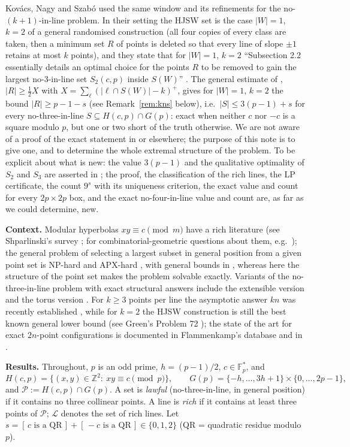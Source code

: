 \documentclass[11pt]{article}
\theoremstyle{remark}
\newcommand{\Fp}{\mathbb{F}_p}
\newcommand{\Z}{\mathbb{Z}}
\newcommand{\Hc}{H(c,p)}
\newcommand{\Gp}{G(p)}
\newcommand{\Lc}{\mathcal{L}}
\newcommand{\Pset}{\mathcal{P}}
\begin{document}
Kov\'acs, Nagy and Szab\'o \cite{KNS25} used the same window and its refinements for the no-$(k+1)$-in-line
problem.  In their setting the HJSW set is the case $|W|=1$, $k=2$ of a general randomised construction (all four
copies of every class are taken, then a minimum set $R$ of points is deleted so that every line of slope $\pm1$ retains
at most $k$ points), and they state that for $|W|=1$, $k=2$ ``Subsection 2.2 essentially details an optimal choice for the points $R$ to be
removed to gain the largest no-3-in-line set $S_2(c,p)$ inside $S(W)$'' \cite[App.~A]{KNS25}.
The general estimate of \cite[Rem.~3.4]{KNS25}, $|R|\ge\tfrac12 X$ with $X=\sum_\ell(|\ell\cap S(W)|-k)^+$, gives for
$|W|=1$, $k=2$ the bound $|R|\ge p-1-s$ (see Remark~\ref{rem:kns} below), i.e.\ $|S|\le3(p-1)+s$ for every no-three-in-line
$S\subseteq\Hc\cap\Gp$: exact when neither $c$ nor $-c$ is a square modulo $p$, but one or two short of the truth
otherwise.  We are not aware of a proof of the exact statement in \cite{KNS25} or elsewhere; the purpose of this note is
to give one, and to determine the whole extremal structure of the problem.  To be explicit about what is new: the value
$3(p-1)$ and the qualitative optimality of $S_2$ and $S_3$ are asserted in \cite{KNS25}; the proof, the classification of
the rich lines, the LP certificate, the count $9^s$ with its uniqueness criterion, the exact value and count for every
$2p\times2p$ box, and the exact no-four-in-line value and count are, as far as we could determine, new.

\medskip
\noindent\textbf{Context.}  Modular hyperbolas $xy\equiv c\pmod m$ have a rich literature (see Shparlinski's survey
\cite{Shp12}; for combinatorial-geometric questions about them, e.g.\ \cite{KMSW}); the general problem of selecting a
largest subset in general position from a given point set is NP-hard and APX-hard \cite{FKNN17}, with general bounds in
\cite{PW13}, whereas here the structure of the point set makes the problem solvable exactly.  Variants of the
no-three-in-line problem with exact structural answers include the extensible version \cite{NNW23,Ghosal26} and the torus
version \cite{KW18}.  For $k\ge3$ points per line the asymptotic answer $kn$ was recently established
\cite{GGGKKP26}, while for $k=2$ the HJSW construction is still the best known general lower bound (see Green's
Problem 72 \cite{Green}); the state of the art for exact $2n$-point configurations is documented in Flammenkamp's
database \cite{FlammenkampDB} and in \cite{Prellberg26}.

\medskip
\noindent\textbf{Results.}  Throughout, $p$ is an odd prime, $h=(p-1)/2$, $c\in\Fp^*$, and
\[
 \Hc=\{(x,y)\in\Z^2:\ xy\equiv c \pmod p\},\qquad
 \Gp=\{-h,\dots,3h+1\}\times\{0,\dots,2p-1\},
\]
and $\Pset:=\Hc\cap\Gp$.  A set is \emph{lawful} (no-three-in-line, in general position) if it contains no three collinear points.  A line is
\emph{rich} if it contains at least three points of $\Pset$; $\Lc$ denotes the set of rich lines.  Let
$s=[\,c\text{ is a QR}\,]+[\,-c\text{ is a QR}\,]\in\{0,1,2\}$ (QR = quadratic residue modulo $p$).
\end{document}

